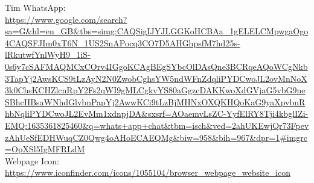 Tim WhatsApp:\\
\url{https://www.google.com/search?sa=G&hl=en_GB&tbs=simg:CAQSigIJYJLGGKoHCBAa_1gELELCMpwgaOgo4CAQSFJIm0xT6N_1US2SnAPocq3CO7D5AHGhpsfM7hd25s-lRkutwfYnlWyH9_1iS-0s6y7cSAFMAQMCxCOrv4IGgoKCAgBEgSYbcOlDAsQne3BCRqeAQoWCgNkb3TapYj2AwsKCS9tLzAyN2N0ZwobCghsYW5ndWFnZdqliPYDCwoJL2ovMnNoX3k0ChsKCHZlcnRpY2Fs2qWI9gMLCgkvYS80aGgzcDAKKwoXdGVjaG5vbG9neSBhcHBsaWNhdGlvbnPapYj2AwwKCi9tLzBjMHNxOXQKHQoKaG9yaXpvbnRhbNqliPYDCwoJL2EvMm1xdnpjDA&sxsrf=AOaemvLsZC-YyfElRY8Tji4kbglIZi-EMQ:1635361825460&q=whats+app+chat&tbm=isch&ved=2ahUKEwjQr73FpevzAhUeSfEDHWuqCZ0Qwg4oAHoECAEQMg&biw=958&bih=967&dpr=1#imgrc=OpXSl5IgMFRLdM}
\\

Webpage Icon:\\
\url{https://www.iconfinder.com/icons/1055104/browser_webpage_website_icon}\\









